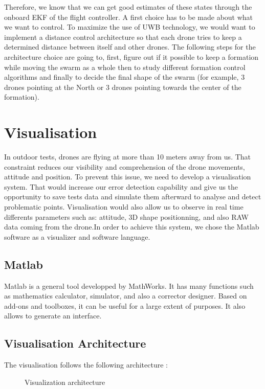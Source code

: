  Therefore, we know that we can get good estimates of these states through the onboard EKF of the flight controller. A first choice has to be made about what we want to control. To maximize the use of UWB technology, we would want to implement a distance control architecture so that each drone tries to keep a determined distance between itself and other drones. The following steps for the architecture choice are going to, first, figure out if it possible to keep a formation while moving the swarm as a whole then to study different formation control algorithms and finally to decide the final shape of the swarm (for example, 3 drones pointing at the North or 3 drones pointing towards the center of the formation).


\newpage

\section{Visualisation}
In outdoor tests, drones are flying at more than 10 meters away from us. That constraint reduces our visibility and comprehension of the drone movements, attitude and position. To prevent this issue, we need to develop a visualisation system. That would increase our error detection capability and give us the opportunity to save tests data and simulate them afterward to analyse and detect problematic points. Visualisation would also allow us to observe in real time differents parameters such as: attitude, 3D shape positionning, and also RAW data coming from the drone.In order to achieve this system, we chose the Matlab software as a visualizer and software language.  

\subsection{Matlab}

Matlab is a general tool developped by MathWorks. It has many functions such as mathematics calculator, simulator, and also a corrector designer. Based on add-ons and toolboxes, it can be useful for a large extent of purposes. It also allows to generate an interface. 

\subsection{Visualisation Architecture}

The visualisation follows the following architecture : 
\begin{figure}[H]
  \centering
   \resizebox{0.9\textwidth}{!}{\SchVisualisation}
  \caption{Visualization architecture}
\end{figure}

